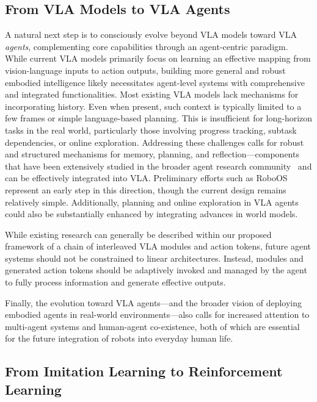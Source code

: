\documentclass[10pt, a4paper, logo, copyright]{googledeepmind} %
\begin{document}
\subsection{From VLA Models to VLA Agents}
\label{subsec:vla-agents}

A natural next step is to consciously evolve beyond VLA models toward VLA \emph{agents}, complementing core capabilities through an agent-centric paradigm. While current VLA models primarily focus on learning an effective mapping from vision-language inputs to action outputs, building more general and robust embodied intelligence likely necessitates agent-level systems with comprehensive and integrated functionalities. Most existing VLA models lack mechanisms for incorporating history. Even when present, such context is typically limited to a few frames or simple language-based planning. This is insufficient for long-horizon tasks in the real world, particularly those involving progress tracking, subtask dependencies, or online exploration. Addressing these challenges calls for robust and structured mechanisms for memory, planning, and reflection---components that have been extensively studied in the broader agent research community~\cite{wang2024survey} and can be effectively integrated into VLA. Preliminary efforts such as RoboOS~\cite{tan2025roboos} represent an early step in this direction, though the current design remains relatively simple. Additionally, planning and online exploration in VLA agents could also be substantially enhanced by integrating advances in world models. 

While existing research can generally be described within our proposed framework of a chain of interleaved VLA modules and action tokens, future agent systems should not be constrained to linear architectures. Instead, modules and generated action tokens should be adaptively invoked and managed by the agent to fully process information and generate effective outputs.

Finally, the evolution toward VLA agents---and the broader vision of deploying embodied agents in real-world environments---also calls for increased attention to multi-agent systems and human-agent co-existence, both of which are essential for the future integration of robots into everyday human life.


\subsection{From Imitation Learning to Reinforcement Learning}
\label{subsec:rl}
\end{document}
